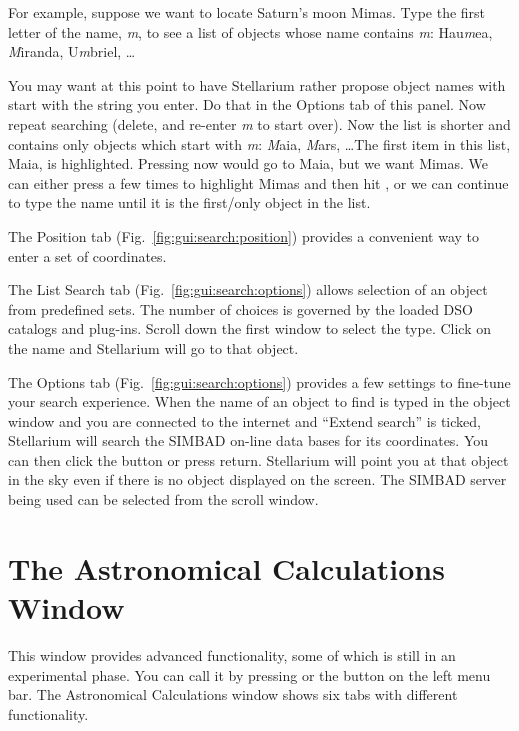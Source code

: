 For example, suppose we want to locate Saturn's moon Mimas. 
Type the first letter of the name, \emph{m}, to see a list
of objects whose name contains \emph{m}: Hau\emph{m}ea, \emph{M}iranda, U\emph{m}briel, \ldots 

You may want at this point to have Stellarium rather propose object
names with start with the string you enter. Do that in the Options tab
of this panel. Now repeat searching (delete, and re-enter \emph{m} to start
over). Now the list is shorter and contains only objects which start
with \emph{m}: \emph{M}aia, \emph{M}ars, \ldots The first item in this list, Maia, is
highlighted. Pressing \key{\return} now would go to Maia, but we want
Mimas. We can either press \key{\tab} a few times to highlight Mimas
and then hit \key{\return}, or we can continue to type the name until
it is the first/only object in the list.

The Position tab (Fig.~\ref{fig:gui:search:position}) provides a convenient way to enter a set
of coordinates.

The List Search tab (Fig.~\ref{fig:gui:search:options}) allows selection of an object from predefined
sets.  The number of choices is governed by the loaded DSO catalogs and plug-ins. 
Scroll down the first window to select the type. Click on the name
and Stellarium will go to that object.

The Options tab (Fig.~\ref{fig:gui:search:options}) provides a few settings to fine-tune your search experience.
When the name of an object to find is typed in the object
window and you are connected to the internet and ``Extend search'' is
ticked, Stellarium will search the SIMBAD on-line  data bases for its
coordinates. You can then click the  button or press return.
Stellarium will point you at that object in the sky even if there is no
object displayed on the screen. The SIMBAD server being used can be
selected from the scroll window.


\section{The Astronomical Calculations Window}
\label{sec:gui:AstroCalc}

This window  provides advanced functionality, some of which is still in an experimental phase. 
You can call it by pressing  or the button  on the left menu bar. 
The Astronomical Calculations window shows six tabs with different functionality.


